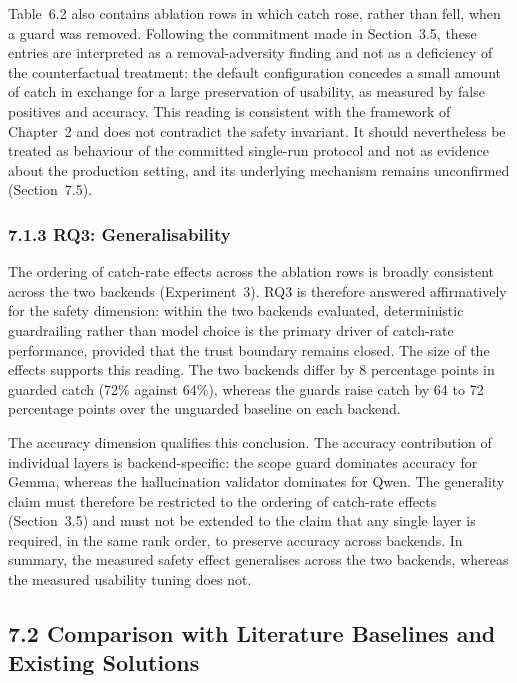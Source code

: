 \documentclass[
]{article}
\begin{document}
Table~6.2 also contains ablation rows in which catch rose, rather than
fell, when a guard was removed. Following the commitment made in
Section~3.5, these entries are interpreted as a removal-adversity
finding and not as a deficiency of the counterfactual treatment: the
default configuration concedes a small amount of catch in exchange for a
large preservation of usability, as measured by false positives and
accuracy. This reading is consistent with the framework of Chapter~2 and
does not contradict the safety invariant. It should nevertheless be
treated as behaviour of the committed single-run protocol and not as
evidence about the production setting, and its underlying mechanism
remains unconfirmed (Section~7.5).

\hypertarget{rq3-generalisability}{%
\subsubsection{7.1.3 RQ3: Generalisability}\label{rq3-generalisability}}

The ordering of catch-rate effects across the ablation rows is broadly
consistent across the two backends (Experiment~3). RQ3 is therefore
answered affirmatively for the safety dimension: within the two backends
evaluated, deterministic guardrailing rather than model choice is the
primary driver of catch-rate performance, provided that the trust
boundary remains closed. The size of the effects supports this reading.
The two backends differ by 8 percentage points in guarded catch (72\%
against 64\%), whereas the guards raise catch by 64 to 72 percentage
points over the unguarded baseline on each backend.

The accuracy dimension qualifies this conclusion. The accuracy
contribution of individual layers is backend-specific: the scope guard
dominates accuracy for Gemma, whereas the hallucination validator
dominates for Qwen. The generality claim must therefore be restricted to
the ordering of catch-rate effects (Section~3.5) and must not be
extended to the claim that any single layer is required, in the same
rank order, to preserve accuracy across backends. In summary, the
measured safety effect generalises across the two backends, whereas the
measured usability tuning does not.

\hypertarget{comparison-with-literature-baselines-and-existing-solutions}{%
\subsection{7.2 Comparison with Literature Baselines and Existing
Solutions}\label{comparison-with-literature-baselines-and-existing-solutions}}
\end{document}
